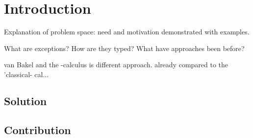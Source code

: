 \chapter{Introduction}

Explanation of problem space: need and motivation demonstrated with examples.

What are exceptions? How are they typed? What have approaches been before?

van Bakel and the \ltry-calculus is different approach. \ltry already compared
to the 'classical- cal...

\section{Solution}

\section{Contribution}
